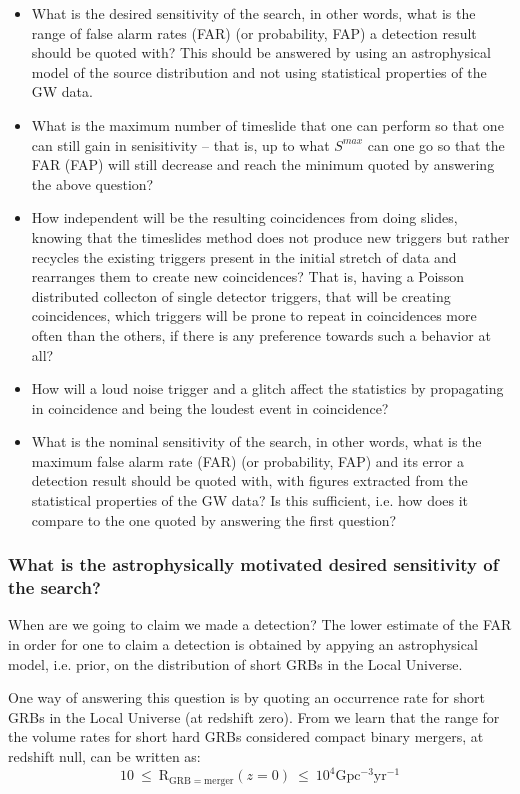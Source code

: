 \documentclass[epsf]{article}
\begin{document}
\begin{itemize}
\item
What is the desired sensitivity of the search, in other words, what is the range of false alarm rates (FAR) (or probability, FAP) a detection result should be quoted with? This should be answered by using an astrophysical model of the source distribution and not using statistical properties of the GW data.
\item
What is the maximum number of timeslide that one can perform so that one can still gain in senisitivity -- that is, up to what $S^{max}$ can one go so that the FAR (FAP) will still decrease and reach the minimum quoted by answering the above question?
\item
How independent will be the resulting coincidences from doing slides, knowing that the timeslides method does not produce new triggers but rather recycles the existing triggers present in the initial stretch of data and rearranges them to create new coincidences? That is, having a Poisson distributed collecton of single detector triggers, that will be creating coincidences, which triggers will be prone to repeat in coincidences more often than the others, if there is any preference towards such a behavior at all?
\item
How will a loud noise trigger and a glitch affect the statistics by propagating in coincidence and being the loudest event in coincidence?
\item
What is the nominal sensitivity of the search, in other words, what is the maximum false alarm rate (FAR) (or probability, FAP) and its error a detection result should be quoted with, with figures extracted from the statistical properties of the GW data? Is this sufficient, i.e. how does it compare to the one quoted by answering the first question?
\end{itemize}
%

\subsubsection{What is the astrophysically motivated desired sensitivity of the search?}

When are we going to claim we made a detection? The lower estimate of the FAR in order for one to claim a detection is obtained by appying an astrophysical model, i.e. prior, on the distribution of short GRBs in the Local Universe. 

One way of answering this question is by quoting an occurrence rate for short GRBs in the Local Universe (at redshift zero). From \cite{Nakar} we learn that the range for the volume rates for short hard GRBs considered compact binary mergers, at redshift null, can be written as:
%
\begin{equation}
10 ~\leq~ \mathrm{R}_{\mathrm{GRB}=\mathrm{merger}}(z=0) ~\leq~ 10^4 \mathrm{Gpc^{-3}yr^{-1}}
\end{equation}
%
\end{document}
